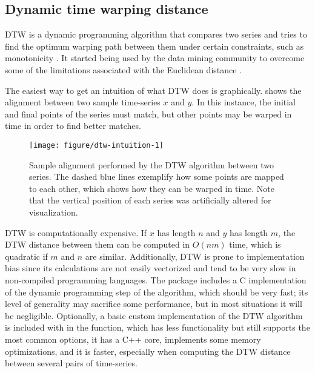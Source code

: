 \subsection{Dynamic time warping distance}
\label{sec:dtw}

DTW is a dynamic programming algorithm that compares two series and tries to find the optimum warping path between them under certain constraints,
such as monotonicity \citep{berndt1994}.
It started being used by the data mining community to overcome some of the limitations associated with the Euclidean distance \citep{keogh2004}.

The easiest way to get an intuition of what DTW does is graphically.
 shows the alignment between two sample time-series $x$ and $y$.
In this instance, the initial and final points of the series must match,
but other points may be warped in time in order to find better matches.

\begin{figure}[htbp]

{\centering \texttt{[image: figure/dtw-intuition-1]}

}

\caption{Sample alignment performed by the DTW algorithm between two series. The dashed blue lines exemplify how some points are mapped to each other, which shows how they can be warped in time. Note that the vertical position of each series was artificially altered for visualization.}\label{fig:dtw-intuition}
\end{figure}

DTW is computationally expensive.
If $x$ has length $n$ and $y$ has length $m$,
the DTW distance between them can be computed in $O(nm)$ time,
which is quadratic if $m$ and $n$ are similar.
Additionally, DTW is prone to implementation bias since its calculations are not easily vectorized and tend to be very slow in non-compiled programming languages.
The  package includes a C implementation of the dynamic programming step of the algorithm,
which should be very fast;
its level of generality may sacrifice some performance,
but in most situations it will be negligible.
Optionally, a basic custom implementation of the DTW algorithm is included with \dtwclust{} in the  function,
which has less functionality but still supports the most common options,
it has a C++ core,
implements some memory optimizations,
and it is faster,
especially when computing the DTW distance between several pairs of time-series.

